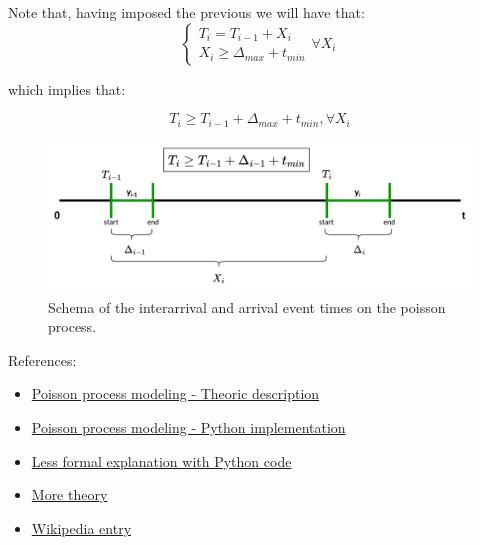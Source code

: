 \documentclass{article}
\begin{document}
\begin{itemize}
    Note that, having imposed the previous we will have that:
    \begin{equation}
      \begin{cases}
        T_i = T_{i-1} + X_i \\
        X_i \geq \Delta_{max} + t_{min}
      \end{cases}\forall X_i \
    \end{equation}

    which implies that:
    
    \begin{equation}
      T_i \geq T_{i-1} + \Delta_{max} + t_{min}, \forall X_i
    \end{equation}
    
\end{itemize}
\begin{figure}[H]
    \centering
    \includegraphics[scale=0.55]{images/tx-generation-dist-corrected.png}
    \caption{Schema of the interarrival and arrival event times on the poisson process.}
\end{figure}


References:

\begin{itemize}
  \item \href{https://www.probabilitycourse.com/chapter11/11_1_2_basic_concepts_of_the_poisson_process.php}{Poisson process modeling - Theoric description}
  \item \href{https://www.probabilitycourse.com/chapter14/Chapter_14.pdf}{Poisson process modeling - Python implementation}
  \item \href{https://timeseriesreasoning.com/contents/poisson-process/}{Less formal explanation with Python code}
  \item \href{https://www.math.wsu.edu/faculty/genz/416/lect/l05-45.pdf}{More theory}
  \item \href{https://en.wikipedia.org/wiki/Poisson_point_process}{Wikipedia entry}
\end{itemize}
\end{document}
